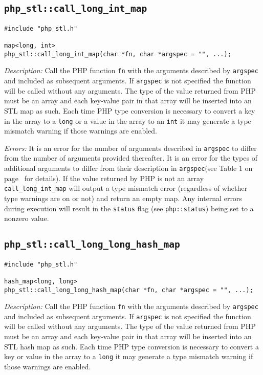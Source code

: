 \documentclass[11pt,titlepage]{article}
\begin{document}
\subsection{\texttt{php\_stl::call\_long\_int\_map}}

\begin{verbatim}
#include "php_stl.h"

map<long, int> 
php_stl::call_long_int_map(char *fn, char *argspec = "", ...);
\end{verbatim}

\emph{Description:} Call the PHP function \verb|fn| with the arguments described by \verb|argspec| and included as subsequent arguments. If \verb|argspec| is not specified the function will be called without any arguments. The type of the value returned from PHP must be an array and each key-value pair in that array will be inserted into an STL map as such. Each time PHP type conversion is necessary to convert a key in the array to a \verb|long| or a value in the array to an \verb|int| it may generate a type mismatch warning if those warnings are enabled.

\emph{Errors:} It is an error for the number of arguments described in \verb|argspec| to differ from the number of arguments provided thereafter. It is an error for the types of additional arguments to differ from their description in \verb|argspec|(see Table 1 on page~\pageref{Table1} for details). If the value returned by PHP is not an array \verb|call_long_int_map| will output a type mismatch error (regardless of whether type warnings are on or not) and return an empty map. Any internal errors during execution will result in the \verb|status| flag (see \verb|php::status|) being set to a nonzero value.


\subsection{\texttt{php\_stl::call\_long\_long\_hash\_map}}

\begin{verbatim}
#include "php_stl.h"

hash_map<long, long> 
php_stl::call_long_long_hash_map(char *fn, char *argspec = "", ...);
\end{verbatim}

\emph{Description:} Call the PHP function \verb|fn| with the arguments described by \verb|argspec| and included as subsequent arguments. If \verb|argspec| is not specified the function will be called without any arguments. The type of the value returned from PHP must be an array and each key-value pair in that array will be inserted into an STL hash map as such. Each time PHP type conversion is necessary to convert a key or value in the array to a \verb|long| it may generate a type mismatch warning if those warnings are enabled.
\end{document}

